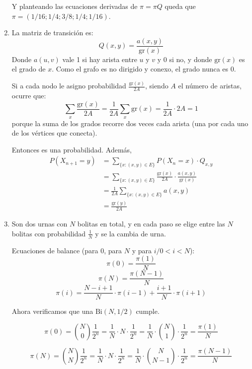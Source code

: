 \begin{enumerate}
		Y planteando las ecuaciones derivadas de $\pi = \pi Q$ queda que $\pi = (1/16; 1/4; 3/8; 1/4; 1/16)$.
		
	\item
		La matriz de transición es:
		$$Q(x,y) = \frac{a(x,y)}{\text{gr}(x)}$$
		Donde $a(u,v)$ vale 1 si hay arista entre $u$ y $v$ y 0 si no, y donde $\text{gr}(x)$ es el grado de $x$.
		Como el grafo es no dirigido y conexo, el grado nunca es 0.
		
		Si a cada nodo le asigno probabilidad $\frac{\text{gr}(x)}{2A}$, siendo $A$ el número de aristas, ocurre que:
		$$\sum_{x}\frac{\text{gr}(x)}{2A} = \frac{1}{2A} \sum_{x}\text{gr}(x) = \frac{1}{2A} \cdot 2A = 1$$
		porque la suma de los grados recorre dos veces cada arista (una por cada uno de los vértices que conecta).
		
		Entonces es una probabilidad.
		Además,
		\begin{align*}
			P(X_{n+1} = y)	& = \sum_{\{x:(x,y) \in E\}}P(X_n = x) \cdot Q_{x,y}									\\
							& = \sum_{\{x:(x,y) \in E\}}\frac{\text{gr}(x)}{2A} \cdot \frac{a(x,y)}{\text{gr}(x)}	\\
							& = \frac{1}{2A}\sum_{\{x:(x,y) \in E\}} a(x,y)											\\
							& = \frac{\text{gr}(y)}{2A}
		\end{align*}
	
	\item
		Son dos urnas con $N$ bolitas en total, y en cada paso se elige entre las $N$ bolitas con probabilidad $\frac{1}{N}$ y se la cambia de urna.
		
		Ecuaciones de balance (para $0$, para $N$ y para $i/0<i<N$):
		$$\pi(0) = \frac{\pi(1)}{N}$$
		$$\pi(N) = \frac{\pi(N-1)}{N}$$
		$$\pi(i) = \frac{N-i+1}{N}\cdot \pi(i-1) + \frac{i+1}{N}\cdot \pi(i+1)$$
		
		Ahora verificamos que una $\text{Bi}(N, 1/2)$ cumple.
		
		$$\pi(0) = \binom{N}{0} \frac{1}{2^n} = \frac{1}{N}\cdot N \cdot \frac{1}{2^n} =
						\frac{1}{N}\cdot \binom{N}{1} \cdot \frac{1}{2^n} = \frac{\pi(1)}{N}$$
						
		$$\pi(N) = \binom{N}{N} \frac{1}{2^n} = \frac{1}{N}\cdot N \cdot \frac{1}{2^n} =
						\frac{1}{N}\cdot \binom{N}{N-1} \cdot \frac{1}{2^n} = \frac{\pi(N-1)}{N}$$
						

\end{enumerate}
